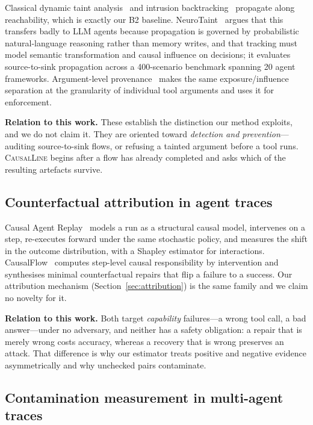 \documentclass[10pt,twocolumn]{article}
\newcommand{\sys}{\textsc{CausalLine}}
\newcommand{\btwo}{\textsf{B2}}
\begin{document}
Classical dynamic taint analysis~\cite{newsome2005} and intrusion
backtracking~\cite{king2003} propagate along reachability, which is exactly
our \btwo{} baseline. NeuroTaint~\cite{neurotaint2026} argues that this
transfers badly to LLM agents because propagation is governed by probabilistic
natural-language reasoning rather than memory writes, and that tracking must
model semantic transformation and causal influence on decisions; it evaluates
source-to-sink propagation across a 400-scenario benchmark spanning 20 agent
frameworks. Argument-level provenance~\cite{granularity2026} makes the same
exposure/influence separation at the granularity of individual tool arguments
and uses it for enforcement.

\textbf{Relation to this work.} These establish the distinction our method
exploits, and we do not claim it. They are oriented toward \emph{detection and
prevention}---auditing source-to-sink flows, or refusing a tainted argument
before a tool runs. \sys{} begins after a flow has already completed and asks
which of the resulting artefacts survive.

\subsection{Counterfactual attribution in agent traces}

Causal Agent Replay~\cite{car2026} models a run as a structural causal model,
intervenes on a step, re-executes forward under the same stochastic policy, and
measures the shift in the outcome distribution, with a Shapley estimator for
interactions. CausalFlow~\cite{causalflow2026} computes step-level causal
responsibility by intervention and synthesises minimal counterfactual repairs
that flip a failure to a success. Our attribution mechanism
(Section~\ref{sec:attribution}) is the same family and we claim no novelty for
it.

\textbf{Relation to this work.} Both target \emph{capability} failures---a
wrong tool call, a bad answer---under no adversary, and neither has a safety
obligation: a repair that is merely wrong costs accuracy, whereas a recovery
that is wrong preserves an attack. That difference is why our estimator treats
positive and negative evidence asymmetrically and why unchecked pairs
contaminate.

\subsection{Contamination measurement in multi-agent traces}
\end{document}
